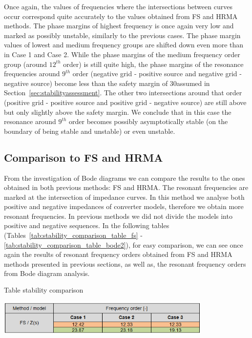 \documentclass[a4paper,11pt,twoside,openright]{report}
\begin{document}
Once again, the values of frequencies where the intersections between curves occur correspond quite accurately to the values obtained from FS and HRMA methods. The phase margins of highest frequency is once again very low and marked as possibly unstable, similarly to the previous cases. The phase margin values of lowest and medium frequency groups are shifted down even more than in Case 1 and Case 2. While the phase margins of the medium frequency order group (around $12^{th}$ order) is still quite high, the phase margins of the resonance frequencies around $9^{th}$ order (negative grid - positive source and negative grid - negative source) become less than the safety margin of 30\degree assumed in Section~\ref{sec:stabilityassessment}. The other two intersections around that order (positive grid - positive source and positive grid - negative source) are still above but only slightly above the safety margin. We conclude that in this case the resonance around $9^{th}$ order becomes possibly asymptotically stable (on the boundary of being stable and unstable) or even unstable.

\subsection{Comparison to FS and HRMA}
From the investigation of Bode diagrams we can compare the results to the ones obtained in both previous methods: FS and HRMA. The resonant frequencies are marked at the intersection of impedance curves. In this method we analyse both positive and negative impedances of converter models, therefore we obtain more resonant frequencies. In previous methods we did not divide the models into positive and negative sequences. In the following tables (Tables~\ref{tab:stability_comparison_table_fs} - \ref{tab:stability_comparison_table_bode2}), for easy comparison, we can see once again the results of resonant frequency orders obtained from FS and HRMA methods presented in previous sections, as well as, the resonant frequency orders from Bode diagram analysis.

\begin{table}[htb]
	\centering
	\caption{Table stability comparison}
	\includegraphics[width=0.8\textwidth]{img/Case123/stability_comparison_table_fs.png}
  	\label{tab:stability_comparison_table_fs}
\end{table}
\FloatBarrier
\end{document}
